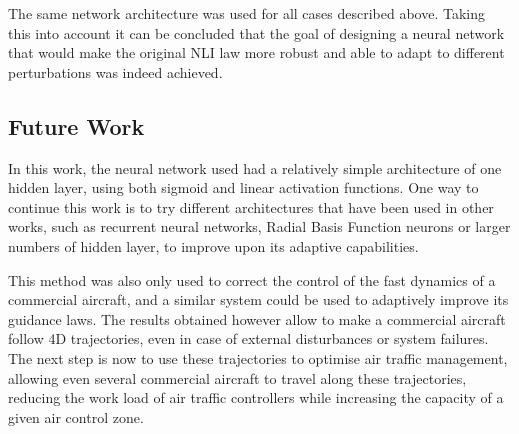 The same network architecture was used for all cases described above. Taking this into account it can be concluded that the goal of designing a neural network that would make the original NLI law more robust and able to adapt to different perturbations was indeed achieved.

\subsection{Future Work}
\label{section:future}

In this work, the neural network used had a relatively simple architecture of one hidden layer, using both sigmoid and linear activation functions. One way to continue this work is to try different architectures that have been used in other works, such as recurrent neural networks, Radial Basis Function neurons or larger numbers of hidden layer, to improve upon its adaptive capabilities. 

This method was also only used to correct the control of the fast dynamics of a commercial aircraft, and a similar system could be used to adaptively improve its guidance laws. The results obtained however allow to make a commercial aircraft follow 4D trajectories, even in case of external disturbances or system failures. The next step is now to use these trajectories to optimise air traffic management, allowing even several commercial aircraft to travel along these trajectories, reducing the work load of air traffic controllers while increasing the capacity of a given air control zone.